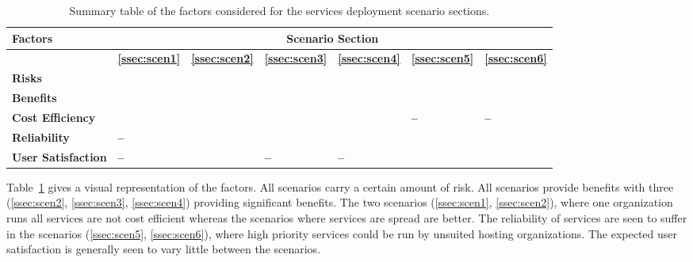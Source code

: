 \documentclass[12pt,a4paper]{article}
\newcommand{\cmark}{\ding{51}}%
\newcommand{\xmark}{\ding{55}}%
\newcommand{\SP}{\cellcolor{green!75} \bf \cmark} %
\newcommand{\MP}{\cellcolor{green!50} \bf \cmark} %
\newcommand{\NU}{\cellcolor{yellow!25} \bf --} %
\newcommand{\MN}{\cellcolor{red!50} \bf \xmark} %
\newcommand{\SN}{\cellcolor{red!75} \bf \xmark} %
\newcommand{\SP}{\cellcolor{blue!75} \bf \hspace{\facc\colwid}\cmark} %
\newcommand{\MP}{\cellcolor{blue!25} \bf \hspace{\facc\colwid}\cmark} %
\newcommand{\NU}{\cellcolor{yellow!25} \bf \hspace{\facc\colwid}--} %
\newcommand{\MN}{\cellcolor{red!25} \bf \hspace{\facc\colwid}\xmark} %
\newcommand{\SN}{\cellcolor{red!75} \bf \hspace{\facc\colwid}\xmark} %
\begin{document}
\begin{table} \centering
\begin{tabular}{p{5cm}|p{\colwid} p{\colwid} p{\colwid} p{\colwid} p{\colwid} p{\colwid}}
{\bf \Large Factors}& \multicolumn{6}{c}{\bf \Large \bf Scenario Section} \\[\pdd] %
  \hline
           & \bf \hspace{\faccc\colwid}\ref{ssec:scen1} & 
             \bf \hspace{\faccc\colwid}\ref{ssec:scen2} & 
             \bf \hspace{\faccc\colwid}\ref{ssec:scen3} & 
             \bf \hspace{\faccc\colwid}\ref{ssec:scen4} & 
             \bf \hspace{\faccc\colwid}\ref{ssec:scen5} & 
             \bf \hspace{\faccc\colwid}\ref{ssec:scen6} \\[\pdd]
\large \bf Risks             & \SN & \SN & \SN & \MN & \SN & \SN
\\[\pdd]
\large \bf Benefits          & \MP & \SP & \SP & \SP & \MP & \MP
\\[\pdd]
\large \bf Cost Efficiency   & \MN & \SN & \MP & \MP & \NU & \NU
\\[\pdd]
\large \bf Reliability       & \NU & \MP & \MP & \MP & \MN & \MN
\\[\pdd]
\large \bf User Satisfaction & \NU & \MN & \NU & \NU & \MN & \MN
\end{tabular}
\caption{Summary table of the factors considered for the \ED services deployment scenario sections.}
\label{tab:summary}
\end{table}


Table~\ref{tab:summary} gives a visual representation of the factors.
All scenarios carry a certain amount of risk.
All scenarios provide benefits with three (\ref{ssec:scen2}, \ref{ssec:scen3}, \ref{ssec:scen4}) providing significant benefits.
The two scenarios (\ref{ssec:scen1}, \ref{ssec:scen2}), where one organization runs all services are not cost efficient whereas the scenarios where services are spread are better.
The reliability of services are seen to suffer in the scenarios (\ref{ssec:scen5}, \ref{ssec:scen6}), where high priority services could be run by unsuited hosting organizations.
The expected user satisfaction is generally seen to vary little between the scenarios.
\end{document}

